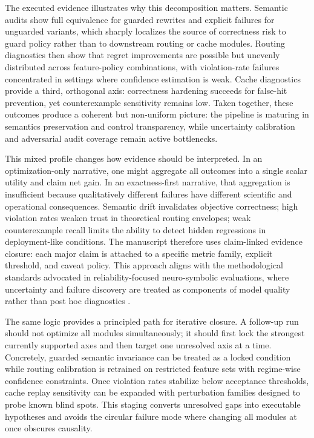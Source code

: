 \documentclass{article} %
\begin{document}
The executed evidence illustrates why this decomposition matters. Semantic audits show full equivalence for guarded rewrites and explicit failures for unguarded variants, which sharply localizes the source of correctness risk to guard policy rather than to downstream routing or cache modules. Routing diagnostics then show that regret improvements are possible but unevenly distributed across feature-policy combinations, with violation-rate failures concentrated in settings where confidence estimation is weak. Cache diagnostics provide a third, orthogonal axis: correctness hardening succeeds for false-hit prevention, yet counterexample sensitivity remains low. Taken together, these outcomes produce a coherent but non-uniform picture: the pipeline is maturing in semantics preservation and control transparency, while uncertainty calibration and adversarial audit coverage remain active bottlenecks.

This mixed profile changes how evidence should be interpreted. In an optimization-only narrative, one might aggregate all outcomes into a single scalar utility and claim net gain. In an exactness-first narrative, that aggregation is insufficient because qualitatively different failures have different scientific and operational consequences. Semantic drift invalidates objective correctness; high violation rates weaken trust in theoretical routing envelopes; weak counterexample recall limits the ability to detect hidden regressions in deployment-like conditions. The manuscript therefore uses claim-linked evidence closure: each major claim is attached to a specific metric family, explicit threshold, and caveat policy. This approach aligns with the methodological standards advocated in reliability-focused neuro-symbolic evaluations, where uncertainty and failure discovery are treated as components of model quality rather than post hoc diagnostics \citep{src_018,src_021,src_029,src_041,src_044}.

The same logic provides a principled path for iterative closure. A follow-up run should not optimize all modules simultaneously; it should first lock the strongest currently supported axes and then target one unresolved axis at a time. Concretely, guarded semantic invariance can be treated as a locked condition while routing calibration is retrained on restricted feature sets with regime-wise confidence constraints. Once violation rates stabilize below acceptance thresholds, cache replay sensitivity can be expanded with perturbation families designed to probe known blind spots. This staging converts unresolved gaps into executable hypotheses and avoids the circular failure mode where changing all modules at once obscures causality.
\end{document}
